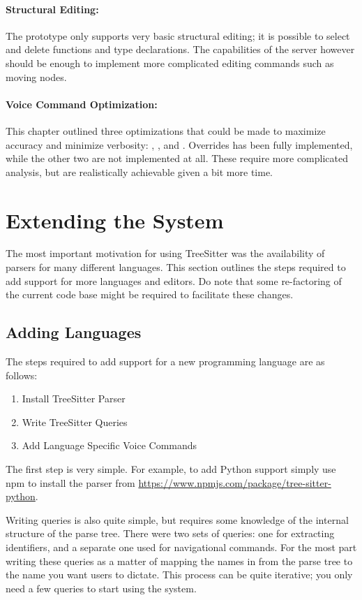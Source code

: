 \documentclass[../thesis.tex]{subfiles}
\begin{document}
\paragraph{Structural Editing:}
The prototype only supports very basic structural editing;
it is possible to select and delete functions and type declarations.
The capabilities of the server however should be enough to implement
more complicated editing commands such as moving nodes.

\paragraph{Voice Command Optimization:}
This chapter outlined three optimizations that could be made to maximize accuracy
and minimize verbosity: , , and .
Overrides has been fully implemented, while the other two are not implemented at all.
These require more complicated analysis, but are realistically achievable given a bit more time.

\section{Extending the System}%
\label{sec:extending_the_system}
The most important motivation for using TreeSitter was the availability
of parsers for many different languages.
This section outlines the steps required to add support for more languages and editors.
Do note that some re-factoring of the current code base might be required
to facilitate these changes.

\subsection{Adding Languages}
The steps required to add support for a new programming language are as follows:
\begin{enumerate}
    \item Install TreeSitter Parser
    \item Write TreeSitter Queries
    \item Add Language Specific Voice Commands
\end{enumerate}
The first step is very simple.
For example, to add Python support simply use npm to install the parser from \url{https://www.npmjs.com/package/tree-sitter-python}.

Writing queries is also quite simple, but requires some knowledge of the internal structure
of the parse tree.
There were two sets of queries: one for extracting identifiers, and a separate one
used for navigational commands.
For the most part writing these queries as a matter of mapping the names
in from the parse tree to the name you want users to dictate.
This process can be quite iterative; you only need a few queries to start using the system.
\end{document}
